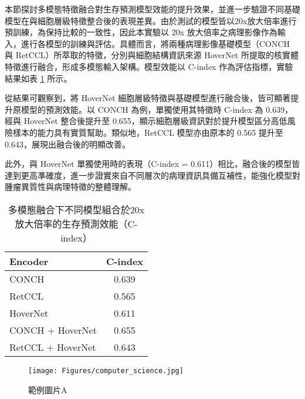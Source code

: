 本節探討多模態特徵融合對生存預測模型效能的提升效果，並進一步驗證不同基礎模型在與細胞層級特徵整合後的表現差異。由於測試的模型皆以20x放大倍率進行預訓練，為保持比較的一致性，因此本實驗以 20x 放大倍率之病理影像作為輸入，進行各模型的訓練與評估。具體而言，將兩種病理影像基礎模型（CONCH 與 RetCCL）所萃取的特徵，分別與細胞結構資訊來源 HoverNet 所提取的核實體特徵進行融合，形成多模態輸入架構。模型效能以 C-index 作為評估指標，實驗結果如表 \ref{tab:multi_modal_results} 所示。

從結果可觀察到，將 HoverNet 細胞層級特徵與基礎模型進行融合後，皆可顯著提升原模型的預測效能。以 CONCH 為例，單獨使用其特徵時 C-index 為 0.639，經與 HoverNet 整合後提升至 0.655，顯示細胞層級資訊對於提升模型區分高低風險樣本的能力具有實質幫助。類似地，RetCCL 模型亦由原本的 0.565 提升至 0.643，展現出融合後的明顯改善。

此外，與 HoverNet 單獨使用時的表現（C-index = 0.611）相比，融合後的模型皆達到更高準確度，進一步證實來自不同層次的病理資訊具備互補性，能強化模型對腫瘤異質性與病理特徵的整體理解。

\begin{table}[ht]
\centering
\begin{tabular}{lc}
\hline
\textbf{Encoder} & \textbf{C-index} \\  %
\hline
CONCH & 0.639 \\
RetCCL & 0.565 \\
HoverNet & 0.611 \\
CONCH + HoverNet & 0.655 \\
RetCCL + HoverNet & 0.643 \\
\hline
\end{tabular}
\caption{多模態融合下不同模型組合於20x放大倍率的生存預測效能（C-index）}
\label{tab:multi_modal_results}
\end{table}


\begin{figure}[hpbt]
    \centering
    \texttt{[image: Figures/computer\_science.jpg]}
    \caption{範例圖片A}
    \label{fig:figexample}
\end{figure}

